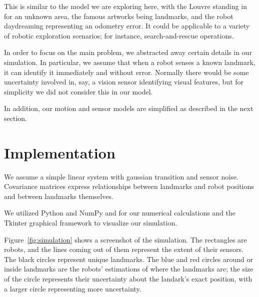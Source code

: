 \documentclass[prodmode,acmtecs]{acmsmall} %
\begin{document}
This is similar to the model we are exploring here, with the Louvre standing in for an unknown area, the famous artworks being landmarks, and the robot daydreaming representing an odometry error.  It could be applicable to a variety of robotic exploration scenarios; for instance, search-and-rescue operations.

In order to focus on the main problem, we abstracted away certain details in our simulation.  In particular, we assume that when a robot senses a known landmark, it can identify it immediately and without error.  Normally there would be some uncertainty involved in, say, a vision sensor identifying visual features, but for simplicity we did not consider this in our model.

In addition, our motion and sensor models are simplified as described in the next section.

\section{Implementation}

We assume a simple linear system with gaussian transition and sensor noise.  Covariance matrices express relationships between landmarks and robot positions and between landmarks themselves.  

We utilized Python and NumPy and for our numerical calculations and the Tkinter graphical framework to visualize our simulation.

Figure~\ref{fig:simulation} shows a screenshot of the simulation.  The rectangles are robots, and the lines coming out of them represent the extent of their sensors.  The black circles represent unique landmarks.  The blue and red circles around or inside landmarks are the robots' estimations of where the landmarks are; the size of the circle represents their uncertainty about the landark's exact position, with a larger circle representing more uncertainty.
\end{document}
